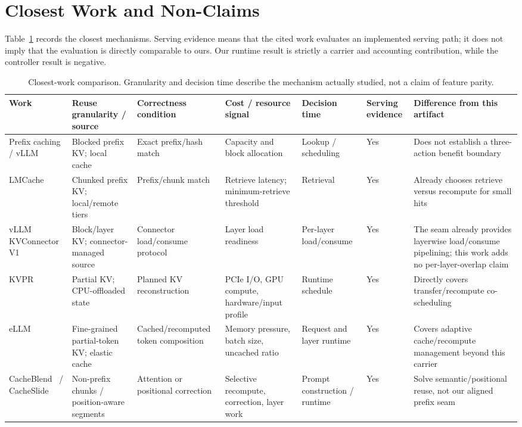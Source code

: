 \documentclass[conference]{IEEEtran}
\begin{document}
\section{Closest Work and Non-Claims}
Table~\ref{tab:comparison} records the closest mechanisms. Serving evidence
means that the cited work evaluates an implemented serving path; it does not
imply that the evaluation is directly comparable to ours. Our runtime result is
strictly a carrier and accounting contribution, while the controller result is
negative.
\begin{table}[t]
\centering
\caption{Closest-work comparison. Granularity and decision time describe the
mechanism actually studied, not a claim of feature parity.}
\label{tab:comparison}
\scriptsize
\setlength{\tabcolsep}{3pt}
\begin{tabular}{p{}p{}p{}p{}p{}p{}p{}}
\toprule
Work & Reuse granularity / source & Correctness condition & Cost / resource signal & Decision time & Serving evidence & Difference from this artifact \\
\midrule
Prefix caching / vLLM~\cite{vllm2023} & Blocked prefix KV; local cache & Exact prefix/hash match & Capacity and block allocation & Lookup / scheduling & Yes & Does not establish a three-action benefit boundary \\
LMCache~\cite{lmcache} & Chunked prefix KV; local/remote tiers & Prefix/chunk match & Retrieve latency; minimum-retrieve threshold & Retrieval & Yes & Already chooses retrieve versus recompute for small hits \\
vLLM KVConnector V1~\cite{vllmkvconnector} & Block/layer KV; connector-managed source & Connector load/consume protocol & Layer load readiness & Per-layer load/consume & Yes & The seam already provides layerwise load/consume pipelining; this work adds no per-layer-overlap claim \\
KVPR~\cite{kvpr2025} & Partial KV; CPU-offloaded state & Planned KV reconstruction & PCIe I/O, GPU compute, hardware/input profile & Runtime schedule & Yes & Directly covers transfer/recompute co-scheduling \\
eLLM~\cite{ellm2026} & Fine-grained partial-token KV; elastic cache & Cached/recomputed token composition & Memory pressure, batch size, uncached ratio & Request and layer runtime & Yes & Covers adaptive cache/recompute management beyond this carrier \\
CacheBlend~\cite{cacheblend2025} / CacheSlide~\cite{cacheslide2026} & Non-prefix chunks / position-aware segments & Attention or positional correction & Selective recompute, correction, layer work & Prompt construction / runtime & Yes & Solve semantic/positional reuse, not our aligned prefix seam \\

\end{tabular}
\end{table}
\end{document}
